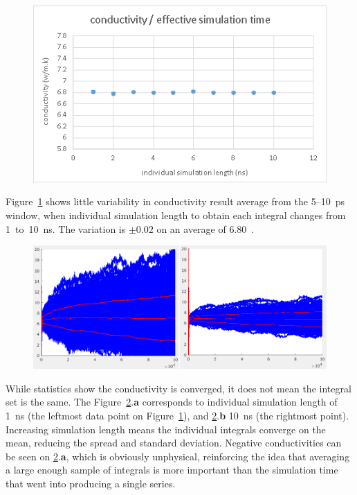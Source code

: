\begin{figure}[hb!]
\includegraphics[width=\linewidth]{Figures/gk_sim_length_conv_graph.png}
\caption[gk simulation length convergence]{}
\label{fig:gk_int_4000_sim_length_conv_graph}
\end{figure}

Figure~\ref{fig:gk_int_4000_sim_length_conv_graph} shows little variability in conductivity result average from the 5--10~ps window, when individual simulation length to obtain each integral changes from 1~to~10~ns. The variation is $\pm0.02$  on an average of 6.80~\wmk. 

\begin{figure}[hb!]
\includegraphics[width=\linewidth]{Figures/gk_int_4000_comp_sim_length.png}
\caption[gk integrals, simulation length convergence]{}
\label{fig:gk_int_4000_sim_length_comp}
\end{figure}

While statistics show the conductivity is converged, it does not mean the integral set is the same. The Figure~\ref{fig:gk_int_4000_sim_length_comp}.\textbf{a} corresponds to individual simulation length of 1~ns (the leftmost data point on Figure~\ref{fig:gk_int_4000_sim_length_conv_graph}), and \ref{fig:gk_int_4000_sim_length_comp}.\textbf{b} 10~ns (the rightmost point). Increasing simulation length means the individual integrals converge on the mean, reducing the spread and standard deviation. Negative conductivities can be seen on \ref{fig:gk_int_4000_sim_length_comp}.\textbf{a}, which is obviously unphysical, reinforcing the idea that averaging a large enough sample of integrals is more important than the simulation time that went into producing a single series.


